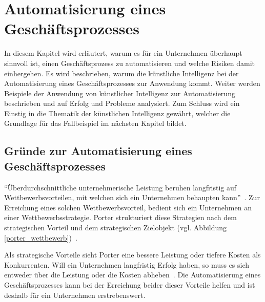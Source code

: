 \section{Automatisierung eines Geschäftsprozesses}

In diesem Kapitel wird erläutert, warum es für ein Unternehmen überhaupt sinnvoll ist, einen Geschäftsprozess zu automatisieren und welche Risiken damit einhergehen. Es wird beschrieben, warum die künstliche Intelligenz bei der Automatisierung eines Geschäftsprozesses zur Anwendung kommt. Weiter werden Beispiele der Anwendung von künstlicher Intelligenz zur Automatisierung beschrieben und auf Erfolg und Probleme analysiert. Zum Schluss wird ein Einstig in die Thematik der künstlichen Intelligenz gewährt, welcher die Grundlage für das Fallbeispiel im nächsten Kapitel bildet.


\subsection{Gründe zur Automatisierung eines Geschäftsprozesses}

\enquote{Überdurchschnittliche unternehmerische Leistung beruhen langfristig auf Wettbewerbsvorteilen, mit welchen sich ein Unternehmen behaupten kann}~\autocite[104]{Capaul2010}. Zur Erreichung eines solchen Wettbewerbsvorteil, bedient sich ein Unternehmen an einer Wettbewerbsstrategie. Porter   strukturiert diese Strategien nach dem strategischen Vorteil und dem strategischen Zielobjekt (vgl. Abbildung \ref{porter_wettbewerb})~\autocite{Capaul2010}. 

Als strategische Vorteile sieht Porter eine bessere Leistung oder tiefere Kosten als Konkurrenten. Will ein Unternehmen langfristig Erfolg haben, so muss es sich entweder über die Leistung oder die Kosten abheben~\autocite{Capaul2010}. Die Automatisierung eines Geschäftsprozesses kann bei der Erreichung beider dieser Vorteile helfen und ist deshalb für ein Unternehmen erstrebenswert. 

